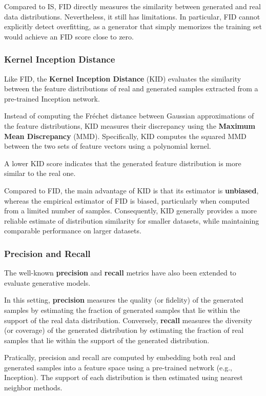 Compared to IS, FID directly measures the similarity between generated and real data distributions. 
Nevertheless, it still has limitations. In particular, FID cannot explicitly detect overfitting, as a generator that simply memorizes the training set would achieve an FID score close to zero.

\subsubsection{Kernel Inception Distance}

Like FID, the \textbf{Kernel Inception Distance} (KID) evaluates the similarity between the feature distributions of real and generated samples extracted from a pre-trained Inception network.

Instead of computing the Fréchet distance between Gaussian approximations of the feature distributions, KID measures their discrepancy using the \textbf{Maximum Mean Discrepancy} (MMD). 
Specifically, KID computes the squared MMD between the two sets of feature vectors using a polynomial kernel.

A lower KID score indicates that the generated feature distribution is more similar to the real one.

Compared to FID, the main advantage of KID is that its estimator is \textbf{unbiased}, whereas the empirical estimator of FID is biased, particularly when computed from a limited number of samples. 
Consequently, KID generally provides a more reliable estimate of distribution similarity for smaller datasets, while maintaining comparable performance on larger datasets.

\subsubsection{Precision and Recall}

The well-known \textbf{precision} and \textbf{recall} metrics have also been extended to evaluate generative models.

In this setting, \textbf{precision} measures the quality (or fidelity) of the generated samples by estimating the fraction of generated samples that lie within the support of the real data distribution. 
Conversely, \textbf{recall} measures the diversity (or coverage) of the generated distribution by estimating the fraction of real samples that lie within the support of the generated distribution.

Pratically, precision and recall are computed by embedding both real and generated samples into a feature space using a pre-trained network (e.g., Inception).
The support of each distribution is then estimated using nearest neighbor methods.

